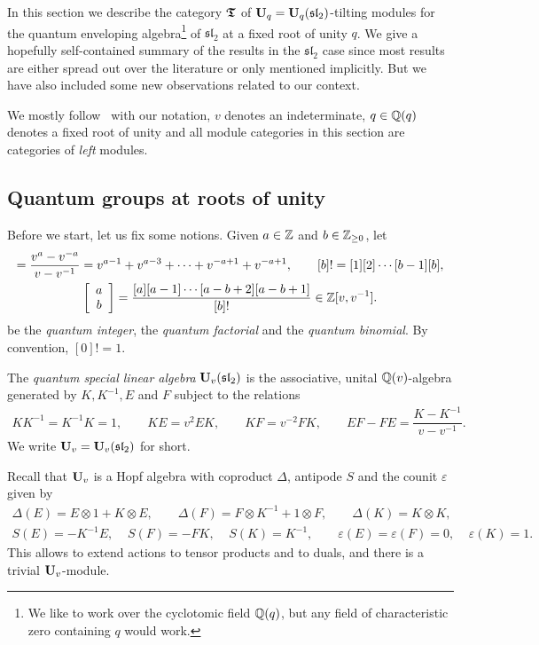 In this section we describe the category $\boldsymbol{\mathfrak{T}}$ of 
$\boldsymbol{\mathrm{U}}_q=\boldsymbol{\mathrm{U}}_q(\mathfrak{sl}_2)$-tilting modules for the quantum enveloping 
algebra\footnote{We like to work over the cyclotomic field $\mathbb{Q}(q)$, but any field of characteristic zero containing $q$ would work.} of $\mathfrak{sl}_2$ at a fixed root of unity $q$.
We give a hopefully self-contained summary of the results in the $\mathfrak{sl}_2$ case 
since most results are either spread out over the 
literature or only mentioned implicitly. But 
we have also included some new observations related to our context.



We mostly follow~\cite[Chapters~1,~2,~3]{ja} with our 
notation, $v$ denotes an indeterminate, $q\in\mathbb{Q}(q)$ denotes a 
fixed root of unity and all module categories 
in this section are categories of \textit{left} 
modules.




\subsection{Quantum groups at roots of unity}\label{sub-qroot}
Before we start, let us fix some notions.
Given $a\in\mathbb{Z}$ and $b\in\mathbb{Z}_{\geq 0}$, let
\begin{gather*}
[a]=\frac{v^a-v^{-a}}{v-v^{-1}}=v^{a-1}+v^{a-3}+\dots+v^{-a+1}+v^{-a+1},\quad\quad[b]!=[1][2]\cdots [b-1][b],\\
\qbin{a}{b}=\frac{[a][a-1]\cdots[a-b+2][a-b+1]}{[b]!}\in\bZ[v,v^{-1}].
\end{gather*}
be the \textit{quantum integer}, the \textit{quantum factorial} and 
the \textit{quantum binomial}.
By convention, $[0]!=1$.


\begin{defn}\label{def-qv} The \textit{quantum special linear algebra} $\boldsymbol{\mathrm{U}}_v(\mathfrak{sl}_2)$ 
is the associative, unital $\mathbb{Q}(v)$-algebra 
generated by $K,K^{-1},E$ and $F$ subject to the relations
\begin{gather*}
KK^{-1}=K^{-1}K=1,\quad\quad KE=v^2EK,\quad\quad KF=v^{-2}FK,\quad\quad
EF-FE =\dfrac{K-K^{-1}}{v-v^{-1}}.
\end{gather*}
We write $\boldsymbol{\mathrm{U}}_v=\boldsymbol{\mathrm{U}}_v(\mathfrak{sl}_2)$ for short.
\end{defn}


Recall that $\boldsymbol{\mathrm{U}}_v$ is a Hopf algebra with coproduct $\Delta$, 
antipode $S$ and the counit $\varepsilon$ given by
\begin{gather*}
\Delta(E)=E\otimes 1+K\otimes E,\quad\quad\Delta(F)=F\otimes K^{-1}+1\otimes F,\quad\quad\Delta(K)=K\otimes K,\\
S(E)=-K^{-1}E,\;\;\;\; S(F)=-FK,\;\;\;\; S(K)=K^{-1},\quad\quad\varepsilon(E)=\varepsilon(F)=0,\;\;\;\;\varepsilon(K)=1.
\end{gather*}
This allows to extend actions 
to tensor products and 
to duals, and there is a trivial $\boldsymbol{\mathrm{U}}_v$-module.



